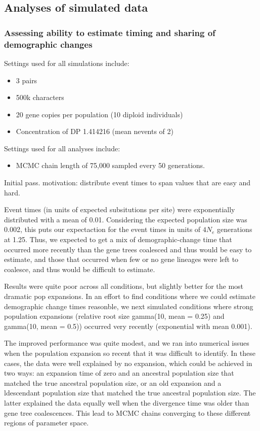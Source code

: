 

\subsection{Analyses of simulated data}

\subsubsection{Assessing ability to estimate timing and sharing of demographic changes}

Settings used for all simulations include:
\begin{itemize}
    \item 3 pairs
    \item 500k characters
    \item 20 gene copies per population (10 diploid individuals)
    \item Concentration of DP 1.414216 (mean nevents of 2)
\end{itemize}

Settings used for all analyses include:
\begin{itemize}
    \item MCMC chain length of 75,000 sampled every 50 generations.
\end{itemize}

Initial pass. motivation: distribute event times to span values that are easy and hard.

Event times (in units of expected subsitutions per site) were exponentially
distributed with a mean of 0.01.
Considering the expected population size was 0.002, this puts our expectaction
for the event times in units of $4N_e$ generations at 1.25.
Thus, we expected to get a mix of demographic-change time that occurred more recently
than the gene trees coalesced and thus would be easy to estimate,
and those that occurred when few or no gene lineages were left to coalesce, and thus would
be difficult to estimate.

Results were quite poor across all conditions, but slightly better for the most dramatic pop expansions.
In an effort to find conditions where we could estimate demographic change times reasonble, we next simulated conditions where strong population expansions (relative root size gamma(10, mean = 0.25) and gamma(10, mean = 0.5)) occurred very recently (exponential with mean 0.001).

The improved performance was quite modest, and we ran into numerical issues when the
population expansion so recent that it was difficult to identify.
In these cases, the data were well explained by no expansion, which could be achieved in two ways: an expansion time of zero and an ancestral population size that matched the true ancestral population size, or an old expansion and a ldescendant population size that matched the true ancestral population size. The latter explained the data equally well when the divergence time was older than gene tree coalescences. This lead to MCMC chains converging to these different regions of parameter space.

